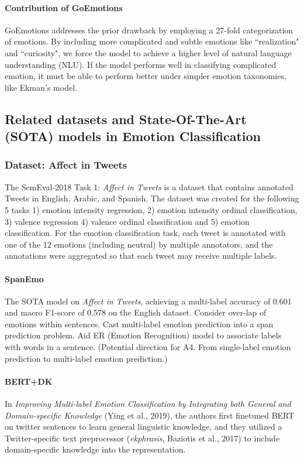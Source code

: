 \documentclass{article}
\begin{document}
\paragraph{Contribution of GoEmotions} GoEmotions addresses the prior drawback by employing a 27-fold categorization of emotions. By including more complicated and subtle emotions like ``realization" and ``curiosity", we force the model to achieve a higher level of natural language understanding (NLU). If the model performs well in classifying complicated emotion, it must be able to perform better under simpler emotion taxonomies, like Ekman's model.  


\subsection{Related datasets and State-Of-The-Art (SOTA) models in Emotion Classification}
\label{related}

\subsubsection{Dataset: Affect in Tweets}
The SemEval-2018 Task 1: \textit{Affect in Tweets} is a dataset that contains annotated Tweets in English, Arabic, and Spanish. The dataset was created for the following 5 tasks 1) emotion intensity
regression, 2) emotion intensity ordinal classification, 3) valence regression 4) valence ordinal classification and 5) emotion classification. For the emotion classification task, each tweet is annotated with one of the 12 emotions (including neutral) by multiple annotators, and the annotations were aggregated so that each tweet may receive multiple labels. 

\paragraph{SpanEmo} The SOTA model on \textit{Affect in Tweets}, achieving a multi-label accuracy of 0.601 and macro F1-score of 0.578 on the English dataset. Consider over-lap of emotions within sentences. Cast multi-label emotion prediction into a span prediction problem. Aid ER (Emotion Recognition) model to associate labels with words in a sentence. (Potential direction for A4. From single-label emotion prediction to multi-label emotion prediction.)

\paragraph{BERT+DK} In \textit{Improving Multi-label Emotion Classification by Integrating both General and Domain-specific Knowledge} (Ying et al., 2019), the authors first finetuned BERT on twitter sentences to learn general linguistic knowledge, and they utilized a Twitter-specific text preprocessor (\textit{ekphrasis}, Baziotis et al., 2017) to include domain-specific knowledge into the representation. 
\end{document}
